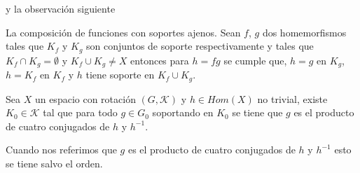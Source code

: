 \documentclass{subfiles}
\begin{document}
y la observación siguiente

\begin{ob}\label{ob:efecto_soporte_2}
La composición de funciones con soportes ajenos. Sean $f$, $g$ dos homemorfismos tales que $K_f$ y $K_g$ son conjuntos de soporte respectivamente y tales que  $K_f \cap K_g = \emptyset$ y $K_f \cup K_g \neq X$ entonces para $h=fg$ se cumple que, $h=g$ en  $ K_g$, $h=K_f$ en $K_f$ y $h$ tiene soporte en $K_f \cup K_g$.
\end{ob}
\begin{lm}\label{lm:lema_1}
Sea $X$ un espacio con rotación $(G,\mathcal{K})$ y $h \in Hom(X)$ no trivial, existe $K_0 \in \mathcal{K}$ tal que para todo $g \in G_0$ soportando en $K_0$ se tiene que $g$ es el producto de cuatro conjugados de $h$ y $h^{-1}$. 
\end{lm}

\begin{ob}
Cuando nos referimos que $g$ es el producto de cuatro conjugados de $h$ y $h^{-1}$ esto se tiene salvo el orden. 
\end{ob}
\end{document}
